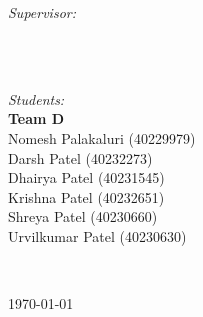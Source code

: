 \begin{titlepage}
\begin{minipage}{0.5\textwidth}
\begin{flushleft} \large
\emph{Supervisor:}\\
\@author\\ %
\end{flushleft}
\end{minipage}
~
\begin{minipage}{0.4\textwidth}
\emph{Students:} \\[1.2em] %
\textbf{Team D}\\
Nomesh Palakaluri (40229979)\\
Darsh Patel (40232273) \\
Dhairya Patel (40231545)\\ 
Krishna Patel (40232651)\\ 
Shreya Patel (40230660)\\
Urvilkumar Patel (40230630) \\[1.2em]

\end{minipage}\\[3cm]
\makeatother



{\large \today}\\[0.5cm] %

\vfill %

\end{titlepage}